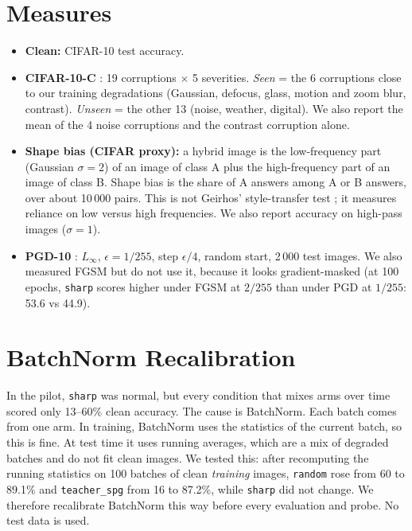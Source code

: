 \documentclass[a4paper,12pt]{report}
\newcommand{\cond}[1]{\texttt{#1}}
\begin{document}
\section{Measures}

\begin{itemize}
\item \textbf{Clean:} CIFAR-10 test accuracy.
\item \textbf{CIFAR-10-C} \cite{hendrycks2019}: 19 corruptions $\times$ 5 severities. \emph{Seen} = the 6 corruptions close to our training degradations (Gaussian, defocus, glass, motion and zoom blur, contrast). \emph{Unseen} = the other 13 (noise, weather, digital). We also report the mean of the 4 noise corruptions and the contrast corruption alone.
\item \textbf{Shape bias (CIFAR proxy):} a hybrid image is the low-frequency part (Gaussian $\sigma=2$) of an image of class A plus the high-frequency part of an image of class B. Shape bias is the share of A answers among A or B answers, over about 10\,000 pairs. This is not Geirhos' style-transfer test \cite{geirhos2019}; it measures reliance on low versus high frequencies. We also report accuracy on high-pass images ($\sigma=1$).
\item \textbf{PGD-10} \cite{madry2018}: $L_\infty$, $\epsilon=1/255$, step $\epsilon/4$, random start, 2\,000 test images. We also measured FGSM but do not use it, because it looks gradient-masked (at 100 epochs, \cond{sharp} scores higher under FGSM at $2/255$ than under PGD at $1/255$: 53.6 vs 44.9).
\end{itemize}

\section{BatchNorm Recalibration}
\label{sec:bn}

In the pilot, \cond{sharp} was normal, but every condition that mixes arms over time scored only 13--60\% clean accuracy. The cause is BatchNorm. Each batch comes from one arm. In training, BatchNorm uses the statistics of the current batch, so this is fine. At test time it uses running averages, which are a mix of degraded batches and do not fit clean images. We tested this: after recomputing the running statistics on 100 batches of clean \emph{training} images, \cond{random} rose from 60 to 89.1\% and \cond{teacher\_spg} from 16 to 87.2\%, while \cond{sharp} did not change. We therefore recalibrate BatchNorm this way before every evaluation and probe. No test data is used.
\end{document}
